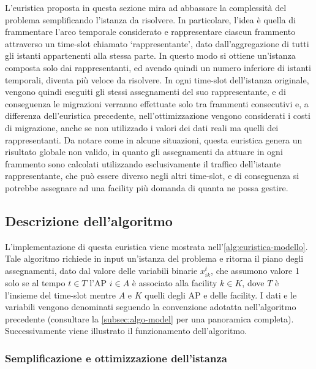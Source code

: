 L'euristica proposta in questa sezione mira ad abbassare la complessità del problema semplificando l'istanza da risolvere. In particolare, l'idea è quella di frammentare l'arco temporale considerato e rappresentare ciascun frammento attraverso un time-slot chiamato `rappresentante', dato dall'aggregazione di tutti gli istanti appartenenti alla stessa parte. In questo modo si ottiene un'istanza composta solo dai rappresentanti, ed avendo quindi un numero inferiore di istanti temporali, diventa più veloce da risolvere. In ogni time-slot dell'istanza originale, vengono quindi eseguiti gli stessi assegnamenti del suo rappresentante, e di conseguenza le migrazioni verranno effettuate solo tra frammenti consecutivi e, a differenza dell'euristica precedente, nell'ottimizzazione vengono considerati i costi di migrazione, anche se non utilizzado i valori dei dati reali ma quelli dei rappresentanti. Da notare come in alcune situazioni, questa euristica genera un risultato globale non valido, in quanto gli assegnamenti da attuare in ogni frammento sono calcolati utilizzando esclusivamente il traffico dell'istante rappresentante, che può essere diverso negli altri time-slot, e di conseguenza si potrebbe assegnare ad una facility più domanda di quanta ne possa gestire.

\subsection{Descrizione dell'algoritmo}
\label{subsec:algo2}



L'implementazione di questa euristica viene mostrata nell'\autoref{alg:euristica-modello}. Tale algoritmo richiede in input un'istanza del problema e ritorna il piano degli assegnamenti, dato dal valore delle variabili binarie $x^t_{ik}$, che assumono valore 1 solo se al tempo $t \in T$ l'AP $i \in A$ è associato alla facility $k \in K$, dove $T$ è l'insieme del time-slot mentre $A$ e $K$ quelli degli AP e delle facility. I dati e le variabili vengono denominati seguendo la convenzione adotatta nell'algoritmo precedente (consultare la \autoref{subsec:algo-model} per una panoramica completa).\\
Successivamente viene illustrato il funzionamento dell'algoritmo.

\subsubsection{Semplificazione e ottimizzazione dell'istanza}


